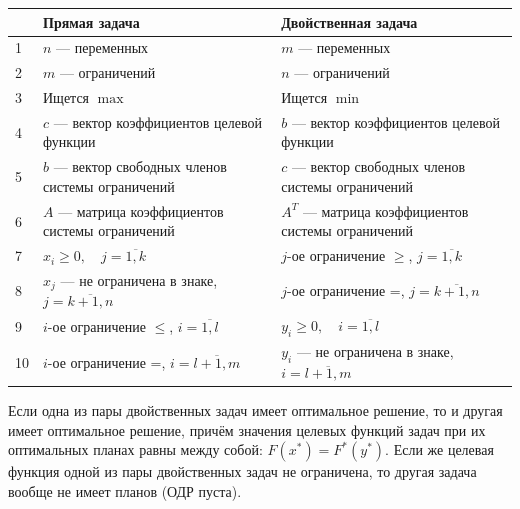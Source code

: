 \documentclass[17pt]{extarticle}
\begin{document}
\begin{center}
    \begin{tabular}{|p{0.5cm}|p{8cm}|p{8cm}|}
        \hline
           & \textbf{Прямая задача}                                   & \textbf{Двойственная задача}                                 \\
        \hline
        1  & \( n \) — переменных                                     & \( m \) — переменных                                         \\
        \hline
        2  & \( m \) — ограничений                                    & \( n \) — ограничений                                        \\
        \hline
        3  & Ищется \( \max \)                                        & Ищется \( \min \)                                            \\
        \hline
        4  & \( c \) — вектор коэффициентов целевой функции           & \( b \) — вектор коэффициентов целевой функции               \\
        \hline
        5  & \( b \) — вектор свободных членов системы ограничений    & \( c \) — вектор свободных членов системы ограничений        \\
        \hline
        6  & \( A \) — матрица коэффициентов системы ограничений      & \( A^T \) — матрица коэффициентов системы ограничений        \\
        \hline
        7  & \( x_i \geq 0, \quad j = \overline{1, k} \)              & \( j \)-ое ограничение \( \geq \), \( j = \overline{1, k} \) \\
        \hline
        8  & $x_j$ — не ограничена в знаке, $j = \overline{k + 1, n}$ & $j$-ое ограничение =, $j = \overline{k + 1, n}$              \\
        \hline
        9  & $i$-ое ограничение \( \leq \), $i = \overline{1, l}$     & $y_i \geq 0, \quad i = \overline{1, l}$                      \\
        \hline
        10 & $i$-ое ограничение =, $i = \overline{l + 1, m}$          & $y_i$ — не ограничена в знаке, $i = \overline{l + 1, m}$     \\
        \hline
    \end{tabular}
\end{center}

\begin{theorem}
    Если одна из пары двойственных задач имеет оптимальное решение, то и другая имеет оптимальное решение,
    причём значения целевых функций задач при их оптимальных планах равны между собой: \(F(x^*) = F^*(y^*)\).
    Если же целевая функция одной из пары двойственных задач не ограничена, то другая задача вообще не имеет планов (ОДР пуста).

\end{theorem}
\end{document}
